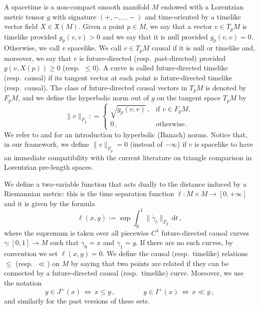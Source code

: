 \documentclass[hidelinks,12pt,a4paper]{article}
\numberwithin{equation}{section}
\theoremstyle{plain}
\theoremstyle{definition}
\renewcommand{\d}{\,\mathrm{d}}
\renewcommand{\d}{\,\mathrm{d}}
\begin{document}
A spacetime is a non-compact smooth manifold $M$ endowed with a Lorentzian metric tensor $g$ with signature $(+, -, \dots -)$ and time-oriented by a timelike vector field $X \in \mathfrak{X}(M)$. 
Given a point $p \in M$, we say that a vector $v \in T_pM$ is timelike provided $g_p(v,v) >0$ and we say that it is null provided $g_p(v,v) =0$. 
Otherwise, we call $v$ spacelike.
We call $v \in T_pM$ causal if it is null or timelike and, moreover, we say that $v$ is future-directed (resp.\ past-directed) provided $g(v,X(p)) \geq 0$ (resp.\ $\leq 0$). 
A curve is called future-directed timelike (resp.\ causal) if its tangent vector at each point is future-directed timelike (resp.\ causal). 
The class of future-directed causal vectors in $T_pM$ is denoted by $F_pM$, and we define the hyperbolic norm out of $g$ on the tangent space $T_pM$ by
\begin{equation*}
\| v\|_{F_g} : = \begin{cases}
\sqrt{g_p(v,v)} \, , & \text{if } v \in F_pM, \\
0 \,, & \text{otherwise} \, .
\end{cases}
\end{equation*} 
We refer to \cite[Section A.3]{Octet} and \cite{HBS} for an introduction to hyperbolic (Banach) norms. 
Notice that, in our framework, we define $\|v\|_{F_g}=0$ (instead of $- \infty$) if $v$ is spacelike to have an immediate compatibility with the current literature on triangle comparison in Lorentzian pre-length spaces.

We define a two-variable function that acts dually to the distance induced by a Riemannian metric: this is the time separation function $\ell: M \times M \rightarrow [0, + \infty]$ and it is given by the formula
\begin{equation}
    \ell(x,y) := \sup \int_0^1 \| \dot \gamma_t \|_{F_g} \d t \, ,
\end{equation}
where the supremum is taken over all piecewise $C^1$ future-directed causal curves $\gamma :[0,1] \rightarrow M$ such that $\gamma_0=x$ and $\gamma_1=y$. 
If there are no such curves, by convention we set $\ell(x,y)= 0$. 
We define the causal (resp.\ timelike) relations $\leq$ (resp.\ $\ll$)  on $M$ by saying that two points are related if they can be connected by a future-directed causal (resp.\ timelike) curve. 
Moreover, we use the notation
\[
y \in J^+(x) \, \Leftrightarrow \, x \leq y \, , \qquad \qquad y \in I^+(x) \, \Leftrightarrow \, x \ll y \, ,
\]
and similarly for the past versions of these sets. 
\end{document}
